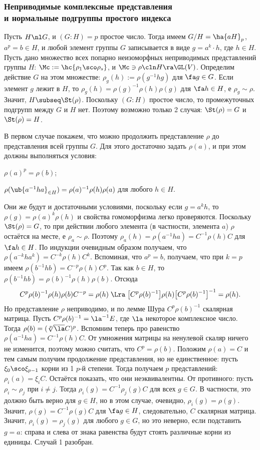 \documentclass[a4paper]{article}
\begin{document}
\subsubsection{Неприводимые комплексные представления\\ и нормальные подгруппы простого индекса}

Пусть $H \nl G$, и $(G:H)=p$ простое число. Тогда имеем $G/H=\ha{aH}_p$, $a^p=b \in H$, и любой  элемент
группы $G$ записывается в виде $g=a^k \cdot h$, где $h \in H$. Пусть дано множество всех попарно неизоморфных
неприводимых представлений группы $H$: $\Mc := \hc{\rho_1 \sco \rho_s}$, и $\Mc \ni \rho\cln H \ra \GL(V)$.
Определим действие $G$ на этом множестве: $\rho_g(h):=\rho(g^{-1}hg)$ для $\fa g \in G$. Если элемент $g$
лежит в $H$, то $\rho_g(h)=\rho(g)^{-1}\rho(h)\rho(g)$ для $\fa h \in H$, е $\rho_g \sim \rho$. Значит,
$H \subseq \St(\rho)$. Поскольку $(G:H)$ простое число, то промежуточных подгрупп между $G$ и $H$ нет.
Поэтому возможно только 2 случая: $\St(\rho)=G$ и $\St(\rho)=H$.

В первом случае покажем, что можно продолжить представление $\rho$ до представления всей группы $G$. Для этого достаточно задать $\rho(a)$, и при этом
должны выполняться условия:

 \; $\rho(a)^p=\rho(b)$;

 \; $\rho(\ub{a^{-1}ha}_{\in H})=\rho(a)^{-1}\rho(h)\rho(a)$ для любого $h \in H$.

Они же будут и достаточными условиями, поскольку если $g=a^k h$, то $\rho(g)=\rho(a)^k\rho(h)$ и свойства
гомоморфизма легко проверяются. Поскольку $\St(\rho)=G$, то при действии любого элемента (в частности,
элемента $a$) $\rho$ остаётся на месте, е $\rho_a \sim \rho$. Поэтому $\rho_a(h)=\rho(a^{-1}h
a)=C^{-1}\rho(h)C$ для $\fa h \in H$. По индукции очевидным образом получаем, что
$\rho(a^{-k}ha^k)=C^{-k}\rho(h)C^{k}$. Вспоминая, что $a^p=b$, получаем, что при $k=p$ имеем $\rho(b^{-1}h
b)=C^{-p}\rho(h)C^{p}$. Так как $b \in H$, то $\rho(b^{-1}hb)=\rho(b)^{-1}\rho(h)\rho(b)$. Отсюда
$$C^p\rho(b)^{-1}\rho(h)\rho(b)C^{-p}=\rho(h) \; \Lra \; \bigl[C^p \rho(b)^{-1}\bigr]\rho(h)\bigl[C^p\rho(b)^{-1}\bigr]^{-1}=\rho(h).$$
Но представление $\rho$ неприводимо, и по лемме Шура $C^p\rho(b)^{-1}$ скалярная матрица.  Пусть
$C^p\rho(b)^{-1}=\la^{-1}E$, где $\la$ некоторое комплексное число. Тогда
$\rho(b)=(\sqrt[p]{\la}C)^p$. Вспомним теперь про равенство $\rho(a^{-1}ha)=C^{-1}\rho(h)C$. От умножения
матрицы на ненулевой скаляр ничего не изменится, поэтому можно считать, что $C^p=\rho(b)$. Положим
$\rho(a)=C$ и тем самым получим продолжение представления, но не единственное: пусть $\xi_0 \sco
\xi_{p-1}$ корни из 1 $p$-й степени. Тогда получаем $p$ представлений: $\rho_i(a)=\xi_i C$. Остаётся
показать, что они неэквивалентны. От противного: пусть $\rho_i \sim \rho_j$ при $i \neq j$. Тогда
$\rho_i(g)=C^{-1}\rho_j(g)C$ для всех $g \in G$. В частности, это должно быть верно для $g \in H$, но в этом
случае, очевидно, $\rho_i(g)=\rho(g)$. Значит, $\rho(g)=C^{-1}\rho(g)C$ для $\fa g \in H$, следовательно,
$C$ скалярная матрица. Значит, $\rho_i(g)=\rho_j(g)$ для любого $g \in G$, но это неверно, если
подставить $g=a$: справа и слева от знака равенства будут стоять различные корни из единицы. Случай 1
разобран.
\end{document}
